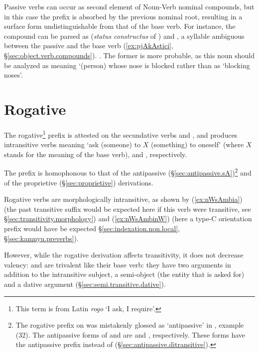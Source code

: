 Passive verbs can occur as second element of Noun-Verb nominal compounds, but in this case the  prefix is absorbed by the previous nominal root, resulting in a surface form undistinguishable from that of the base verb. For instance, the compound  can be parsed as  (\textit{status constructus} of  ) and , a syllable ambiguous between the passive  and the base verb   (\ref{ex:pjAkAstici}, §\ref{sec:object.verb.compounds}). . The former is more probable, as this noun should be analyzed as meaning `(person) whose nose is blocked rather than as `blocking noses'.
 
\section{Rogative} \label{sec:rogative.derivation}
The rogative\footnote{This term is from Latin \textit{rogo} `I ask, I require'. }  prefix is attested on the secundative verbs  and , and produces intransitive verbs meaning `ask (someone) to $X$ (something) to oneself’ (where $X$ stands for the meaning of the base verb),  and  , respectively.

The  prefix is homophonous to that of the antipassive (§\ref{sec:antipassive.sA})\footnote{The rogative prefix on  was mistakenly glossed as `antipassive’ in \citet[215]{jacques12demotion}, example (32). The  antipassive forms of  and   are  and , respectively. These forms have the  antipassive prefix instead of  (§\ref{sec:antipassive.ditransitive}). } and of the proprietive (§\ref{sec:proprietive}) derivations.

Rogative verbs are morphologically intransitive, as shown by (\ref{ex:nWsAmbia}) (the past transitive suffix  would be expected here if this verb were transitive, see §\ref{sec:transitivity.morphology}) and (\ref{ex:nWsAmbinW}) (here a type-C orientation prefix would have be expected §\ref{sec:indexation.non.local}, §\ref{sec:kamnyu.preverbs}). 

However, while the rogative derivation affects transitivity, it does not decrease valency:  and   are trivalent like their base verb: they have two arguments in addition to the intransitive subject, a semi-object (the entity that is asked for) and a dative argument (§\ref{sec:semi.transitive.dative}).

